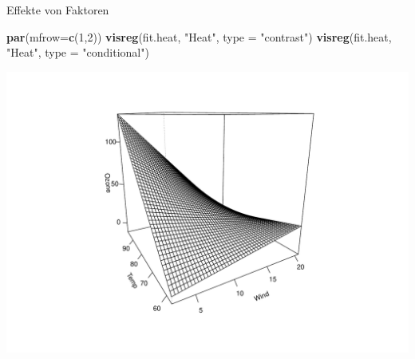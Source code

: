 \documentclass[ignorenonframetext,]{beamer}
\newenvironment{Shaded}{}{}
\newcommand{\KeywordTok}[1]{\textcolor[rgb]{0.00,0.44,0.13}{\textbf{{#1}}}}
\newcommand{\DataTypeTok}[1]{\textcolor[rgb]{0.56,0.13,0.00}{{#1}}}
\newcommand{\DecValTok}[1]{\textcolor[rgb]{0.25,0.63,0.44}{{#1}}}
\newcommand{\StringTok}[1]{\textcolor[rgb]{0.25,0.44,0.63}{{#1}}}
\newcommand{\NormalTok}[1]{{#1}}
\begin{document}
\begin{frame}[fragile]{Effekte von Faktoren}

\begin{Shaded}
\begin{Highlighting}[]
\KeywordTok{par}\NormalTok{(}\DataTypeTok{mfrow=}\KeywordTok{c}\NormalTok{(}\DecValTok{1}\NormalTok{,}\DecValTok{2}\NormalTok{))}
\KeywordTok{visreg}\NormalTok{(fit.heat, }\StringTok{"Heat"}\NormalTok{, }\DataTypeTok{type =} \StringTok{"contrast"}\NormalTok{)}
\KeywordTok{visreg}\NormalTok{(fit.heat, }\StringTok{"Heat"}\NormalTok{, }\DataTypeTok{type =} \StringTok{"conditional"}\NormalTok{)}
\end{Highlighting}
\end{Shaded}

\includegraphics{R_intern_files/figure-beamer/unnamed-chunk-314-1.pdf}

\end{frame}
\end{document}
